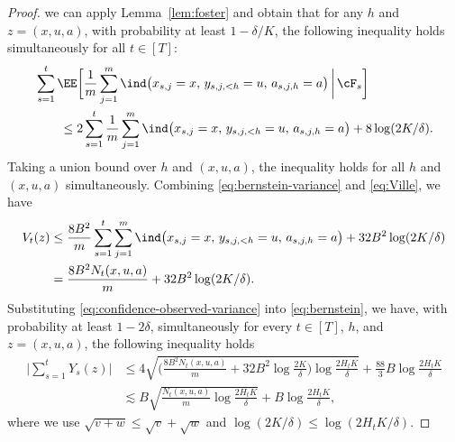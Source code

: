 \documentclass[11pt]{article}
\begin{document}
\begin{proof}
we can apply Lemma~\ref{lem:foster} and obtain that for any $h$ and $z=(x,u,a)$, with probability at least $1-\delta/K$, the following inequality holds simultaneously for all $t \in [T]$:
\begin{align}
\notag
    &\sum_{s=1}^t\EE\bigg[
        \frac{1}{m}\sum_{j=1}^m
        \ind\bigl(
            x_{s,j}=x,\,
            y_{s,j,<h}=u,\,
            a_{s,j,h}=a
        \bigr)
        \,\bigg|\,
        \cF_s
    \bigg]\\\label{eq:Ville}
    &\qquad \le 2 \sum_{s=1}^t\frac{1}{m}\sum_{j=1}^m
    \ind\bigl(
        x_{s,j}=x,\,
        y_{s,j,<h}=u,\,
        a_{s,j,h}=a
    \bigr) + 8 \log (2K/\delta).
\end{align}
Taking a union bound over $h$ and $(x,u,a)$, the inequality holds for all $h$ and $(x,u,a)$ simultaneously. Combining \eqref{eq:bernstein-variance} and \eqref{eq:Ville}, we have
\begin{align}
    V_t(z)
    &\leq
    \frac{8B^2}{m}
    \sum_{s=1}^t\sum_{j=1}^m
    \ind\bigl(
        x_{s,j}=x,\,
        y_{s,j,<h}=u,\,
        a_{s,j,h}=a
    \bigr)
    +
    32B^2\log({2K}/{\delta})\notag\\
    &=
    \frac{8B^2N_t(x,u,a)}m
    +
    32B^2\log({2K}/{\delta}).
    \label{eq:confidence-observed-variance}
\end{align}
Substituting \eqref{eq:confidence-observed-variance} into \eqref{eq:bernstein}, we have, with
probability at least $1-2\delta$, simultaneously for every
$t\in[T]$, $h$, and $z=(x,u,a)$, the following inequality holds
\begin{align*}
    \bigg|\sum_{s=1}^tY_s(z)\bigg|
    &\leq
    4\sqrt{
        \Big(
            \frac{8B^2N_t(x,u,a)}m
            +
            32B^2\log\frac{2K}{\delta}
        \Big)
        \log\frac{2H_tK}{\delta}
    }
    +
    \frac{88}{3}B\log\frac{2H_tK}{\delta}\\
    &\lesssim
    B\sqrt{
        \frac{N_t(x,u,a)}m
        \log\frac{2H_tK}{\delta}
    }
    +
    B\log\frac{2H_tK}{\delta},
\end{align*}
where we use $\sqrt{v+w}\leq\sqrt v+\sqrt w$ and
$\log(2K/\delta)\leq\log(2H_tK/\delta)$.


\end{proof}
\end{document}
